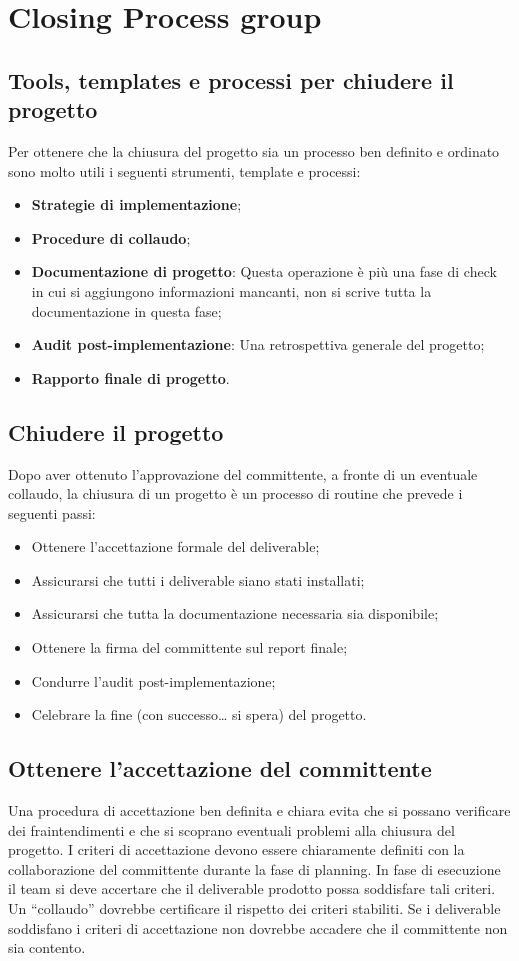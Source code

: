 \section{Closing Process group}
\subsection{Tools, templates e processi per chiudere il progetto}
Per ottenere che la chiusura del progetto sia un processo ben definito e ordinato sono molto utili i seguenti strumenti, template e processi:
\begin{itemize}
	\item \textbf{Strategie di implementazione};
	\item \textbf{Procedure di collaudo};
	\item \textbf{Documentazione di progetto}: Questa operazione è più una fase di check in cui si aggiungono informazioni mancanti, non si scrive tutta la documentazione in questa fase;
	\item \textbf{Audit post-implementazione}: Una retrospettiva generale del progetto;
	\item \textbf{Rapporto finale di progetto}.
\end{itemize}

\subsection{Chiudere il progetto}
Dopo aver ottenuto l’approvazione del committente, a fronte di un eventuale collaudo, la chiusura di un progetto è un processo di routine che prevede i seguenti passi:
\begin{itemize}
	\item Ottenere l’accettazione formale del deliverable;
	\item Assicurarsi che tutti i deliverable siano stati installati;
	\item Assicurarsi che tutta la documentazione necessaria sia disponibile;
	\item Ottenere la firma del committente sul report finale;
	\item Condurre l’audit post-implementazione;
	\item Celebrare la fine (con successo… si spera) del progetto.
\end{itemize}

\subsection{Ottenere l’accettazione del committente}
Una procedura di accettazione ben definita e chiara evita che si possano verificare dei fraintendimenti e che si scoprano eventuali problemi alla chiusura del progetto. I criteri di accettazione devono essere chiaramente definiti con la collaborazione del committente durante la fase di planning. In fase di esecuzione il team si deve accertare che il deliverable prodotto possa soddisfare tali criteri. Un “collaudo” dovrebbe certificare il rispetto dei criteri stabiliti. Se i deliverable soddisfano i criteri di accettazione non dovrebbe accadere che il committente non sia contento.

